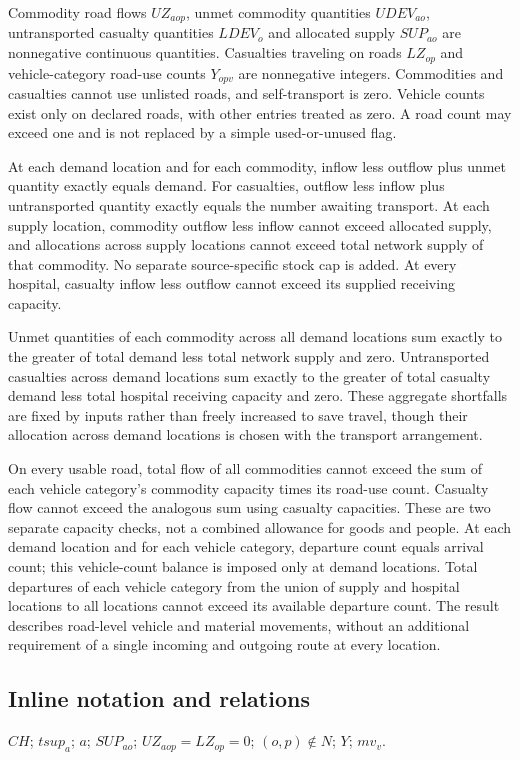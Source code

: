 \documentclass[10pt]{article}
\begin{document}
Commodity road flows $UZ_{aop}$, unmet commodity quantities $UDEV_{ao}$, untransported casualty quantities $LDEV_o$ and allocated supply $SUP_{ao}$ are nonnegative continuous quantities. Casualties traveling on roads $LZ_{op}$ and vehicle-category road-use counts $Y_{opv}$ are nonnegative integers. Commodities and casualties cannot use unlisted roads, and self-transport is zero. Vehicle counts exist only on declared roads, with other entries treated as zero. A road count may exceed one and is not replaced by a simple used-or-unused flag.

At each demand location and for each commodity, inflow less outflow plus unmet quantity exactly equals demand. For casualties, outflow less inflow plus untransported quantity exactly equals the number awaiting transport. At each supply location, commodity outflow less inflow cannot exceed allocated supply, and allocations across supply locations cannot exceed total network supply of that commodity. No separate source-specific stock cap is added. At every hospital, casualty inflow less outflow cannot exceed its supplied receiving capacity.

Unmet quantities of each commodity across all demand locations sum exactly to the greater of total demand less total network supply and zero. Untransported casualties across demand locations sum exactly to the greater of total casualty demand less total hospital receiving capacity and zero. These aggregate shortfalls are fixed by inputs rather than freely increased to save travel, though their allocation across demand locations is chosen with the transport arrangement.

On every usable road, total flow of all commodities cannot exceed the sum of each vehicle category's commodity capacity times its road-use count. Casualty flow cannot exceed the analogous sum using casualty capacities. These are two separate capacity checks, not a combined allowance for goods and people. At each demand location and for each vehicle category, departure count equals arrival count; this vehicle-count balance is imposed only at demand locations. Total departures of each vehicle category from the union of supply and hospital locations to all locations cannot exceed its available departure count. The result describes road-level vehicle and material movements, without an additional requirement of a single incoming and outgoing route at every location.

\subsection*{Inline notation and relations}
$CH$; $tsup_a$; $a$; $SUP_{ao}$; $UZ_{aop}=LZ_{op}=0$; $(o,p)\notin N$; $Y$; $mv_v$.
\end{document}
